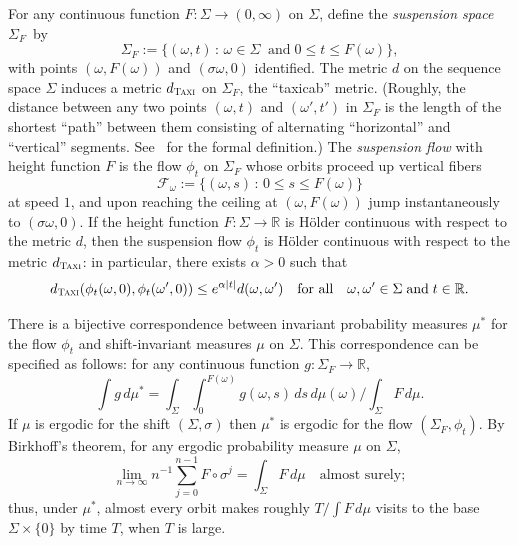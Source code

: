\documentclass[AHL, Unicode, longabstracts, published]{cedram}
\newcommand{\zz}[1]{\mathbb #1}
\begin{document}
For any continuous function $F:\Sigma \rightarrow (0,\infty)$ on $\Sigma$, define the \emph{suspension space} $\Sigma_{F}$~by
\[
\Sigma_{F} :=\{(\omega,t)\,:\, \omega\in \Sigma \;\; \text{and} \; 0\leq t\leq F (\omega)\},
\]
with points $(\omega,F (\omega))$ and $(\sigma \omega,0)$ identified. The metric $d$ on the sequence space $\Sigma$ induces a metric $d_{\textsc{Taxi}}$ on $\Sigma_{F}$, the ``taxicab'' metric. (Roughly, the distance between any two points $(\omega, t)$ and $(\omega',t')$ in $\Sigma_{F}$ is the length of the shortest ``path'' between them consisting of alternating ``horizontal'' and ``vertical'' segments. See~\cite{bowen-walters} for the formal definition.) The \emph{suspension flow} with height function $F$ is the flow $\phi_{t}$ on $\Sigma_{F}$ whose orbits proceed up vertical fibers
\[
\mathcal{F}_{\omega}:=\{(\omega,s)\,:\,0\leq s\leq F (\omega) \}
\]
at speed $1$, and upon reaching the ceiling at $(\omega,F (\omega))$ jump instantaneously to $(\sigma \omega,0)$. If the height function $F: \Sigma \rightarrow \mathbb{R}$ is H\"older continuous with respect to the metric $d$, then the suspension flow $\phi_{t}$ is H\"older continuous with respect to the metric $d_{\textsc{Taxi}}$: in particular, there exists $\alpha>0$ such that
\begin{equation}\label{eq:suspFlowHolder}
d_{\textsc{Taxi}}(\phi_{t}(\omega,0), \phi_{t}(\omega',0))\leq e^{\alpha |t|}d(\omega,\omega') \quad \text{for all} \quad
\omega,\omega'\in\Sigma \; \text{and} \; t \in \mathbb{R}.
\end{equation}



There is a bijective correspondence between invariant probability measures $\mu^{*}$ for the flow $\phi_{t}$ and shift-invariant measures $\mu$ on $\Sigma$. This correspondence can be specified as follows: for any continuous function $g:\Sigma_{F} \rightarrow \zz{R}$,
\begin{equation}\label{eq:measure-transfer}
\int g\, d\mu^{*}=\int_{\Sigma}\int_{0}^{F (\omega)} g (\omega,s) \,ds\,d\mu (\omega) /\int_{\Sigma}F\,d\mu.
\end{equation}
If $\mu$ is ergodic for the shift $(\Sigma,\sigma)$ then $\mu^{*}$ is ergodic for the flow $(\Sigma_{F},\phi_{t})$. By Birkhoff's theorem, for any ergodic probability measure $\mu$ on $\Sigma$,
\begin{equation}\label{eq:birkhoff-F}
\lim_{n \rightarrow \infty}n^{-1}\sum_{j=0}^{n-1}F\circ\sigma^{j} =\int_{\Sigma}F\,d\mu \quad \text{almost surely};
\end{equation}
thus, under $\mu^{*}$, almost every orbit makes roughly $T/\int F\,d\mu$ visits to the base $\Sigma \times \{0 \}$ by time $T$, when $T$ is large.
\end{document}
